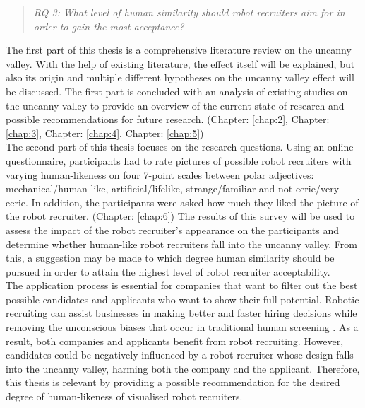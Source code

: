 \begin{quote}\emph{RQ 3: What level of human similarity should robot recruiters aim for in order to gain the most acceptance?}\end{quote} 

The first part of this thesis is a comprehensive literature review on the uncanny valley. With the help of existing literature, the effect itself will be explained, but also its origin and multiple different hypotheses on the uncanny valley effect will be discussed. The first part is concluded with an analysis of existing studies on the uncanny valley to provide an overview of the current state of research and possible recommendations for future research. (Chapter: \ref{chap:2},  Chapter: \ref{chap:3},  Chapter: \ref{chap:4},  Chapter: \ref{chap:5})\\
The second part of this thesis focuses on the research questions. Using an online questionnaire, participants had to rate pictures of possible robot recruiters with varying human-likeness on four 7-point scales between polar adjectives: mechanical/human-like, artificial/lifelike, strange/familiar and not eerie/very eerie. In addition, the participants were asked how much they liked the picture of the robot recruiter. (Chapter: \ref{chap:6})\newline
The results of this survey will be used to assess the impact of the robot recruiter's appearance on the participants and determine whether human-like robot recruiters fall into the uncanny valley. From this, a suggestion may be made to which degree human similarity should be pursued in order to attain the highest level of robot recruiter acceptability.\\
The application process is essential for companies that want to filter out the best possible candidates and applicants who want to show their full potential. Robotic recruiting can assist businesses in making better and faster hiring decisions while removing the unconscious biases that occur in traditional human screening \cite{robot_recruiting_scholar}. As a result, both companies and applicants benefit from robot recruiting. However, candidates could be negatively influenced by a robot recruiter whose design falls into the uncanny valley, harming both the company and the applicant. Therefore, this thesis is relevant by providing a possible recommendation for the desired degree of human-likeness of visualised robot recruiters.